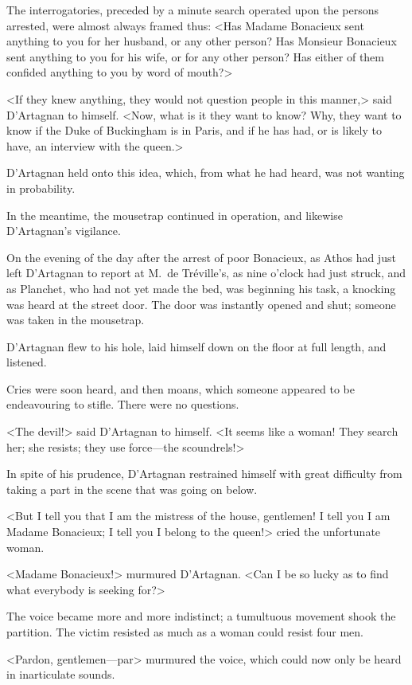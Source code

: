 The interrogatories, preceded by a minute search operated upon the persons arrested, were almost always framed thus: <Has Madame Bonacieux sent anything to you for her husband, or any other person? Has Monsieur Bonacieux sent anything to you for his wife, or for any other person? Has either of them confided anything to you by word of mouth?> 

<If they knew anything, they would not question people in this manner,> said D'Artagnan to himself. <Now, what is it they want to know? Why, they want to know if the Duke of Buckingham is in Paris, and if he has had, or is likely to have, an interview with the queen.> 

D'Artagnan held onto this idea, which, from what he had heard, was not wanting in probability. 

In the meantime, the mousetrap continued in operation, and likewise D'Artagnan's vigilance. 

On the evening of the day after the arrest of poor Bonacieux, as Athos had just left D'Artagnan to report at M.~de Tréville's, as nine o'clock had just struck, and as Planchet, who had not yet made the bed, was beginning his task, a knocking was heard at the street door. The door was instantly opened and shut; someone was taken in the mousetrap. 

D'Artagnan flew to his hole, laid himself down on the floor at full length, and listened. 

Cries were soon heard, and then moans, which someone appeared to be endeavouring to stifle. There were no questions. 

<The devil!> said D'Artagnan to himself. <It seems like a woman! They search her; she resists; they use force—the scoundrels!> 

In spite of his prudence, D'Artagnan restrained himself with great difficulty from taking a part in the scene that was going on below. 

<But I tell you that I am the mistress of the house, gentlemen! I tell you I am Madame Bonacieux; I tell you I belong to the queen!> cried the unfortunate woman. 

<Madame Bonacieux!> murmured D'Artagnan. <Can I be so lucky as to find what everybody is seeking for?> 

The voice became more and more indistinct; a tumultuous movement shook the partition. The victim resisted as much as a woman could resist four men. 

<Pardon, gentlemen—par\longdash> murmured the voice, which could now only be heard in inarticulate sounds. 

